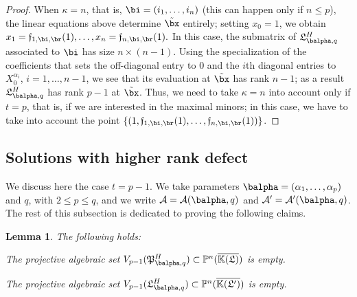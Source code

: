 \documentclass[12pt]{article}
\newtheorem{lemma}[definition]{Lemma}
\begin{document}
\begin{proof}
  When $\kappa=n$, that is, $\bi=(i_1,\dots,i_n)$ (this can happen
  only if $n \le p$), the linear equations above determine $\tilde\bx$
  entirely; setting $x_0=1$, we obtain
  $x_{1}=\mathfrak{f}_{1,\bi,\br}(1),\dots,x_{n}=\mathfrak{f}_{n,\bi,\br}(1).$
  In this case, the submatrix of $\mathfrak{L}^H_{\balpha,q}$
  associated to $\bi$ has size $n \times (n-1)$. Using the
  specialization of the coefficients that sets the off-diagonal entry
  to $0$ and the $i$th diagonal entries to $X_0^{\alpha_i}$,
  $i=1,\dots,n-1$, we see that its evaluation at $\tilde\bx$ has rank
  $n-1$; as a result $\mathfrak{L}^H_{\balpha,q}$ has rank $p-1$ at
  $\tilde \bx$. Thus, we need to take $\kappa=n$ into account only if
  $t=p$, that is, if we are interested in the maximal minors; in this
  case, we have to take into account the point $\left \{
  (1,\mathfrak{f}_{1,\bi,\br}(1),\dots,\mathfrak{f}_{n,\bi,\br}(1))\right
  \}$.
\end{proof}


\subsection{Solutions with higher rank defect} 

We discuss here the case $t=p-1$.  We take parameters
$\balpha=(\alpha_1,\dots,\alpha_p)$ and $q$, with $2 \le p \le q$, and
we write ${\cal A}={\cal A}(\balpha,q)$ and ${\cal A}'={\cal
  A}'(\balpha,q)$.  The rest of this subsection is dedicated to
proving the following claims.

\begin{lemma} The following holds:
\begin{description}[leftmargin=*]
\item[$\assI_1(\balpha,q).$] The projective algebraic set
  $V_{p-1}(\mathfrak{P}^H_{\balpha,q})\subset\P^n(\KKGbar)$ is empty.
\item[$\assJ_1(\balpha,q).$] The projective algebraic set
  $V_{p-1}(\mathfrak{L}^H_{\balpha,q})\subset\P^n(\KKGpbar)$ is empty.
\end{description}
\end{lemma}
\end{document}
